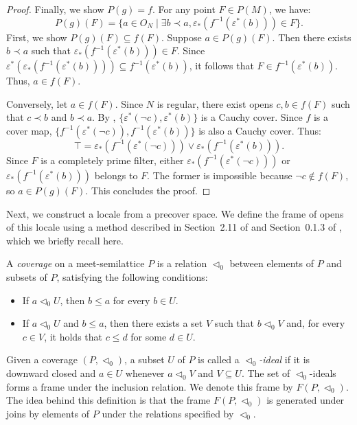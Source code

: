 \documentclass[pdflatex,sn-mathphys-num]{sn-jnl}
\theoremstyle{definition}
\theoremstyle{remark}
\numberwithin{figure}{section}
\newcommand{\rb}{\prec}
\begin{document}
\begin{proof}
Finally, we show $P(g) = f$.
For any point $F \in P(M)$, we have:
\[
P(g)(F) = \{ a \in O_N \mid \exists b \rb a, \varepsilon_*(f^{-1}(\varepsilon^*(b))) \in F \}.
\]
First, we show $P(g)(F) \subseteq f(F)$.
Suppose $a \in P(g)(F)$.
Then there exists $b \rb a$ such that $\varepsilon_*(f^{-1}(\varepsilon^*(b))) \in F$.
Since $\varepsilon^*(\varepsilon_*(f^{-1}(\varepsilon^*(b)))) \subseteq f^{-1}(\varepsilon^*(b))$, it follows that $F \in f^{-1}(\varepsilon^*(b))$.
Thus, $a \in f(F)$.

Conversely, let $a \in f(F)$.
Since $N$ is regular, there exist opens $c,b \in f(F)$ such that $c \rb b$ and $b \rb a$.
By , $\{ \varepsilon^*(\neg c), \varepsilon^*(b) \}$ is a Cauchy cover.
Since $f$ is a cover map, $\{ f^{-1}(\varepsilon^*(\neg c)), f^{-1}(\varepsilon^*(b)) \}$ is also a Cauchy cover.
Thus:
\[
\top = \varepsilon_*(f^{-1}(\varepsilon^*(\neg c))) \vee \varepsilon_*(f^{-1}(\varepsilon^*(b))).
\]
Since $F$ is a completely prime filter, either $\varepsilon_*(f^{-1}(\varepsilon^*(\neg c)))$ or $\varepsilon_*(f^{-1}(\varepsilon^*(b)))$ belongs to $F$.
The former is impossible because $\neg c \notin f(F)$, so $a \in P(g)(F)$.
This concludes the proof.
\end{proof}

Next, we construct a locale from a precover space.
We define the frame of opens of this locale using a method described in Section~2.11 of \cite{stone-spaces} and Section~0.1.3 of \cite{vickers-compact}, which we briefly recall here.

A \emph{coverage} on a meet-semilattice $P$ is a relation $\triangleleft_0$ between elements of $P$ and subsets of $P$, satisfying the following conditions:
\begin{itemize}
\item If $a \triangleleft_0 U$, then $b \leq a$ for every $b \in U$.
\item If $a \triangleleft_0 U$ and $b \leq a$, then there exists a set $V$ such that $b \triangleleft_0 V$ and, for every $c \in V$, it holds that $c \leq d$ for some $d \in U$.
\end{itemize}

Given a coverage $(P,\triangleleft_0)$, a subset $U$ of $P$ is called a \emph{$\triangleleft_0$-ideal} if it is downward closed and $a \in U$ whenever $a \triangleleft_0 V$ and $V \subseteq U$.
The set of $\triangleleft_0$-ideals forms a frame under the inclusion relation.
We denote this frame by $F(P,\triangleleft_0)$.
The idea behind this definition is that the frame $F(P, \triangleleft_0)$ is generated under joins by elements of $P$ under the relations specified by $\triangleleft_0$.
\end{document}
